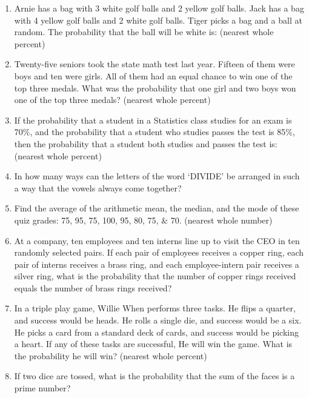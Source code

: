 \documentclass[../uilmath.tex]{subfiles}
\begin{document}
\begin{enumerate}[label=\bfseries\arabic*.]
    \item %
    Arnie has a bag with 3 white golf balls and 2 yellow golf balls. Jack has a bag with 4 yellow golf balls and 2 white golf balls.
    Tiger picks a bag and a ball at random. The probability that the ball will be white is: (nearest whole percent)

    \item %
    Twenty-five seniors took the state math test last year. Fifteen of them were boys and ten were girls. All of them had an equal chance to win one of the top three medals. What was the probability that one girl and two boys won one of the top three medals? (nearest whole percent)

    \item %
    If the probability that a student in a Statistics class studies for an exam is 70\%, and the probability that a student who studies passes the test is 85\%, then the probability that a student both studies and passes the test is: (nearest whole percent)

    \item %
    In how many ways can the letters of the word `DIVIDE' be arranged in such a way that the vowels always come together?

    \item %
    Find the average of the arithmetic mean, the median, and the mode of these quiz grades: 75, 95, 75, 100, 95, 80, 75, \& 70. (nearest whole number)

    \item %
    At a company, ten employees and ten interns line up to visit the CEO in ten randomly selected pairs. If each pair of employees 
    receives a copper ring, each pair of interns receives a brass ring, and each employee-intern pair receives a silver ring, what is the probability that the number of copper rings 
    received equals the number of brass rings received?

    \item %
    In a triple play game, Willie When performs three tasks. He flips a quarter, and success would be heads. He rolls a single die, and success would be a six. He picks a card from a standard 
    deck of cards, and success would be picking a heart. If any of these tasks are successful, He will win the game. What is the probability he will win? (nearest whole percent)

    \item %
    If two dice are tossed, what is the probability that the sum of the faces is a prime number?


\end{enumerate}
\end{document}
